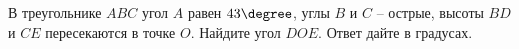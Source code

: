 \begin{ex}
	\begin{condition}
		В треугольнике \( ABC \) угол \( A \) равен \( 43\degree \), углы \( B \) и \( C \)  – острые, высоты \( BD \) и \( CE \) пересекаются в точке \( O \). Найдите угол \( DOE \). Ответ дайте в градусах.
	\end{condition}
\end{ex}